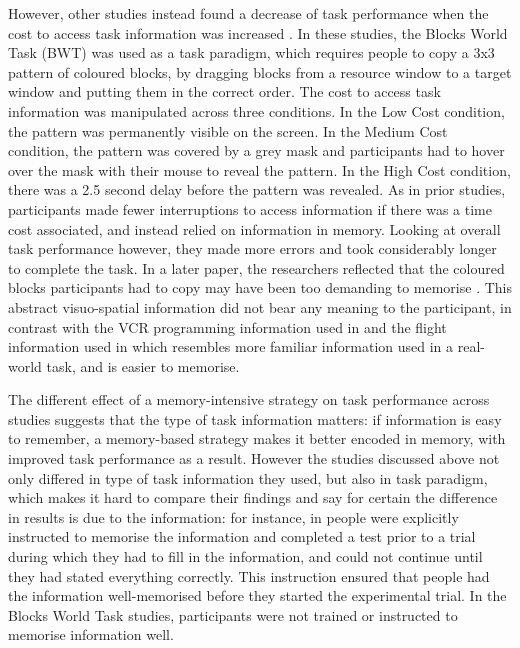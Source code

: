 However, other studies instead found a decrease of task performance when the cost to access task information was increased \citep{Gray2006, Morgan2009}. In these studies, the Blocks World Task (BWT) was used as a task paradigm, which requires people to copy a 3x3 pattern of coloured blocks, by dragging blocks from a resource window to a target window and putting them in the correct order. The cost to access task information was manipulated across three conditions. In the Low Cost condition, the pattern was permanently visible on the screen. In the Medium Cost condition, the pattern was covered by a grey mask and participants had to hover over the mask with their mouse to reveal the pattern. In the High Cost condition, there was a 2.5 second delay before the pattern was revealed. As in prior studies, participants made fewer interruptions to access information if there was a time cost associated, and instead relied on information in memory. Looking at overall task performance however, they made more errors and took considerably longer to complete the task. In a later paper, the researchers reflected that the coloured blocks participants had to copy may have been too demanding to memorise \citep{Waldron2011}. This abstract visuo-spatial information did not bear any meaning to the participant, in contrast with the VCR programming information used in \citet{Gray2004} and the flight information used in \citet{Waldron2007} which resembles more familiar information used in a real-world task, and is easier to memorise.

The different effect of a memory-intensive strategy on task performance across studies suggests that the type of task information matters: if information is easy to remember, a memory-based strategy makes it better encoded in memory, with improved task performance as a result. However the studies discussed above not only differed in type of task information they used, but also in task paradigm, which makes it hard to compare their findings and say for certain the difference in results is due to the information: for instance, in \citet{Gray2004} people were explicitly instructed to memorise the information and completed a test prior to a trial during which they had to fill in the information, and could not continue until they had stated everything correctly. This instruction ensured that people had the information well-memorised before they started the experimental trial. In the Blocks World Task studies, participants were not trained or instructed to memorise information well.

